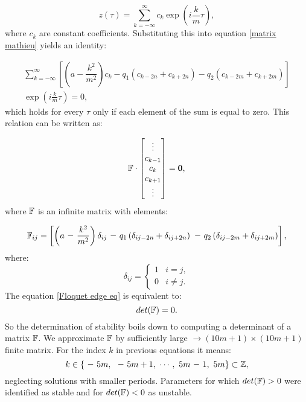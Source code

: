 \begin{equation}
	\label{Floquet ansatz}
	z(\tau) = \sum_{k=-\infty}^{\infty} c_k \exp(i\frac{k}{m}\tau),
\end{equation}
where $c_k$ are constant coefficients. Substituting this into equation \eqref{matrix mathieu} yields an identity:

\begin{multline}
	\sum_{k=\minus\infty}^{\infty}\left[ \left(a \minus \dfrac{k^2}{m^2} \right)c_k \minus q_1 \left(c_{k-2n} + c_{k+2n} \right) \minus q_2 \left(c_{k-2m} + c_{k+2m} \right)  \right] \\ \exp(i\frac{k}{m}\tau) = 0,
\end{multline}
which holds for every $\tau$ only if each element of the sum is equal to zero. This relation can be written as:

\begin{equation}
	\label{Floquet edge eq}
	\mathbb{F} \cdot \begin{bmatrix}
	\vdots \\
	c_{k-1} \\
	c_{k} \\
	c_{k+1} \\
	\vdots
	\end{bmatrix} = \vb{0},
\end{equation}
where $\mathbb{F}$ is an infinite matrix with elements:

\begin{equation}
	\tensorq{F}_{i j} = \left[ \left(a \minus \dfrac{k^2}{m^2} \right)\delta_{i j} \minus q_1 \left(\delta_{i j-2n} + \delta_{i j+2n} \right) \minus q_2 \left(\delta_{i j-2m} + \delta_{i j+2m} \right)  \right],
\end{equation} 
where:
\begin{equation}
	\delta_{ij} = 
	\begin{cases}
		1 & i=j, \\
		0 & i \neq j.
	\end{cases}	
\end{equation}
The equation \eqref{Floquet edge eq} is equivalent to:
\begin{equation}
	\label{Floquet determinant}
	det(\mathbb{F}) = 0.
\end{equation}
So the determination of stability boils down to computing a determinant of a matrix $\mathbb{F}$. We approximate $\mathbb{F}$ by sufficiently large $\rightarrow (10m+1) \times (10m+1)$ finite matrix. For the index $k$ in previous equations it means: $$k \in \{ \minus 5m, \ \minus 5m+1, \  \cdots, \ 5m \minus 1, \ 5m \} \subset \Z,$$ neglecting solutions with smaller periods. Parameters for which $det(\mathbb{F}) > 0$ were identified as stable and for $det(\mathbb{F}) < 0$ as unstable.
 	
